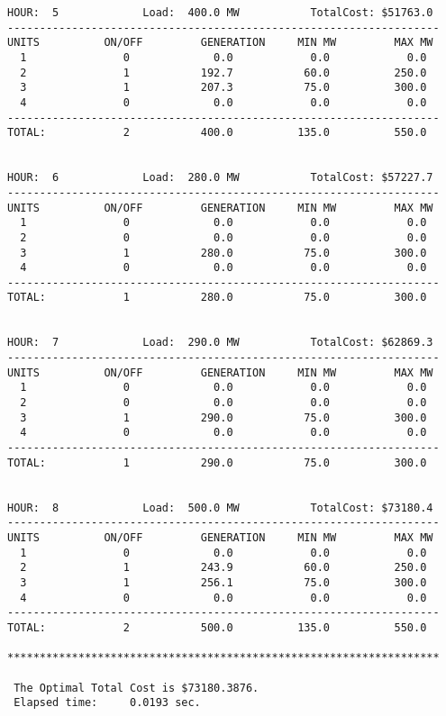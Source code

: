 \begin{verbatim}
HOUR:  5             Load:  400.0 MW           TotalCost: $51763.0
-------------------------------------------------------------------
UNITS          ON/OFF         GENERATION     MIN MW         MAX MW
  1               0             0.0            0.0            0.0
  2               1           192.7           60.0          250.0
  3               1           207.3           75.0          300.0
  4               0             0.0            0.0            0.0
-------------------------------------------------------------------
TOTAL:            2           400.0          135.0          550.0


HOUR:  6             Load:  280.0 MW           TotalCost: $57227.7
-------------------------------------------------------------------
UNITS          ON/OFF         GENERATION     MIN MW         MAX MW
  1               0             0.0            0.0            0.0
  2               0             0.0            0.0            0.0
  3               1           280.0           75.0          300.0
  4               0             0.0            0.0            0.0
-------------------------------------------------------------------
TOTAL:            1           280.0           75.0          300.0


HOUR:  7             Load:  290.0 MW           TotalCost: $62869.3
-------------------------------------------------------------------
UNITS          ON/OFF         GENERATION     MIN MW         MAX MW
  1               0             0.0            0.0            0.0
  2               0             0.0            0.0            0.0
  3               1           290.0           75.0          300.0
  4               0             0.0            0.0            0.0
-------------------------------------------------------------------
TOTAL:            1           290.0           75.0          300.0


HOUR:  8             Load:  500.0 MW           TotalCost: $73180.4
-------------------------------------------------------------------
UNITS          ON/OFF         GENERATION     MIN MW         MAX MW
  1               0             0.0            0.0            0.0
  2               1           243.9           60.0          250.0
  3               1           256.1           75.0          300.0
  4               0             0.0            0.0            0.0
-------------------------------------------------------------------
TOTAL:            2           500.0          135.0          550.0

*******************************************************************

 The Optimal Total Cost is $73180.3876.
 Elapsed time:     0.0193 sec.

\end{verbatim}

